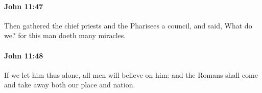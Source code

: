 		\paragraph{John 11:47} %
			\label{JOHN-11-47}

			Then gathered the chief priests and the Pharisees a council, and said, What do we? for this man doeth many miracles.

			\begin{framed}
				\scriptsize
				\begin{compactdesc}
					\item[SBLG] 
				\end{compactdesc}
			\end{framed}

		\paragraph{John 11:48} %
			\label{JOHN-11-48}

			If we let him thus alone, all men will believe on him: and the Romans shall come and take away both our place and nation.

